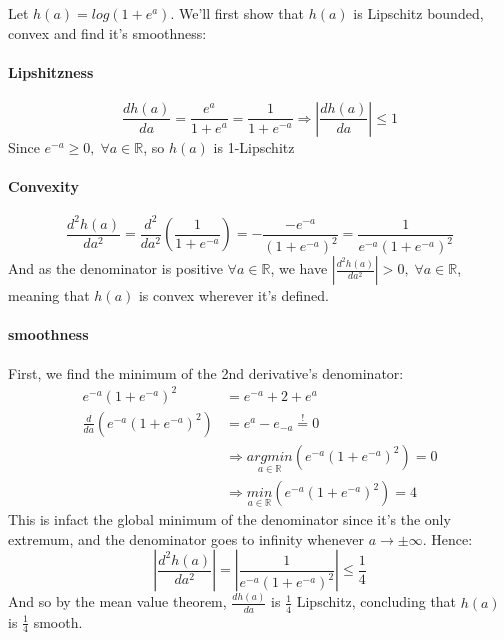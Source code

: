 \subsubsection{}
Let $h(a) = log(1 + e^a)$. We'll first show that $h(a)$ is Lipschitz bounded, convex and find it's smoothness:

\paragraph{Lipshitzness}
\begin{equation*}
    \frac{dh(a)}{da} = \frac{e^a}{1+e^a}  = \frac{1}{1+e^{-a}} \Rightarrow |\frac{dh(a)}{da}| \leq 1
\end{equation*}
Since $e^{-a} \geq 0, \; \forall a\in \mathbb{R}$, so $h(a)$ is 1-Lipschitz

\paragraph{Convexity}
\begin{equation*}
    \frac{d^2h(a)}{da^2} = \frac{d^2}{da^2} \left(\frac{1}{1+e^{-a}}\right) = -\frac{-e^{-a}}{(1+e^{-a})^2} = 
    \frac{1}{e^{-a}(1+e^{-a})^2}
\end{equation*}
And as the denominator is positive $\forall a\in \mathbb{R}$, we have $|\frac{d^2h(a)}{da^2}| > 0, \; \forall a\in \mathbb{R}$, meaning that $h(a)$ is convex wherever it's defined.

\paragraph{smoothness}
First, we find the minimum of the 2nd derivative's denominator:
\begin{equation*}
    \begin{split}
        e^{-a}(1+e^{-a})^2 &= e^{-a} + 2 + e^a \\
        \frac{d}{da}(e^{-a}(1+e^{-a})^2) &= e^a - e_{-a} \overset{!}{=} 0 \\
        &\Rightarrow \underset{a\in \mathbb{R}}{argmin} (e^{-a}(1+e^{-a})^2) = 0 \\
        &\Rightarrow \underset{a\in \mathbb{R}}{min} (e^{-a}(1+e^{-a})^2) = 4
    \end{split}
\end{equation*}
This is infact the global minimum of the denominator since it's the only extremum, and the denominator goes to infinity whenever $a\rightarrow \pm \infty$. Hence:
\begin{equation*}
    |\frac{d^2h(a)}{da^2}| = |\frac{1}{e^{-a}(1+e^{-a})^2}| \leq \frac{1}{4}
\end{equation*}
And so by the mean value theorem, $\frac{dh(a)}{da}$ is $\frac{1}{4}$ Lipschitz, concluding that $h(a)$ is $\frac{1}{4}$ smooth.

